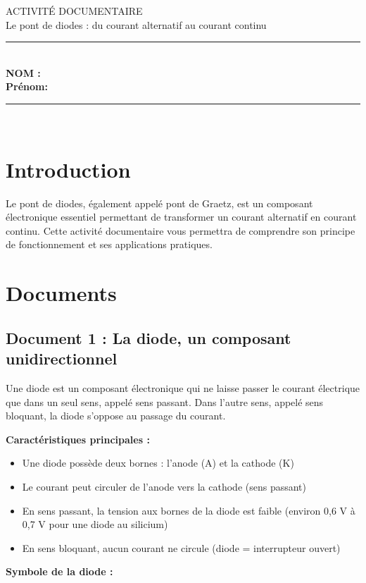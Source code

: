 \documentclass[11pt,a4paper]{article}
\begin{document}
\center \LARGE{ACTIVITÉ DOCUMENTAIRE}\\[0,2cm]
\Large{Le pont de diodes : du courant alternatif au courant continu}\\[0,3cm]
\normalsize
\hrule\\[0,2cm]
\flushleft \textbf{NOM :\\[0.2cm]
Prénom:\\[0,2cm]}
\hrule\\[0,2cm]

\section{Introduction}

Le pont de diodes, également appelé pont de Graetz, est un composant électronique essentiel permettant de transformer un courant alternatif en courant continu. Cette activité documentaire vous permettra de comprendre son principe de fonctionnement et ses applications pratiques.

\section{Documents}

\subsection{Document 1 : La diode, un composant unidirectionnel}

Une diode est un composant électronique qui ne laisse passer le courant électrique que dans un seul sens, appelé sens passant. Dans l'autre sens, appelé sens bloquant, la diode s'oppose au passage du courant.

\vspace{0.3cm}
\textbf{Caractéristiques principales :}
\begin{itemize}
\item Une diode possède deux bornes : l'anode (A) et la cathode (K)
\item Le courant peut circuler de l'anode vers la cathode (sens passant)
\item En sens passant, la tension aux bornes de la diode est faible (environ 0,6 V à 0,7 V pour une diode au silicium)
\item En sens bloquant, aucun courant ne circule (diode = interrupteur ouvert)
\end{itemize}

\vspace{0.3cm}
\textbf{Symbole de la diode :}
\end{document}
